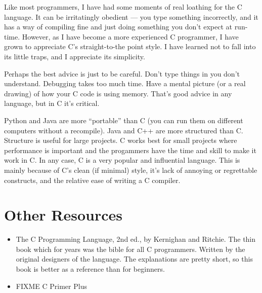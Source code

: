 Like most programmers, I have had some moments of real loathing for the C language. It can be irritatingly obedient --- you type something incorrectly, and it has a way of compiling fine and just doing something you don't expect at run-time. However, as I have become a more experienced C programmer, I have grown to appreciate C's straight-to-the point style. I have learned not to fall into its little traps, and I appreciate its simplicity.

Perhaps the best advice is just to be careful. Don't type things in you don't understand. Debugging takes too much time. Have a mental picture (or a real drawing) of how your C code is using memory. That's good advice in any language, but in C it's critical.

Python and Java are more ``portable'' than C (you can run them on different computers without a recompile). Java and C++ are more structured than C. Structure is useful for large projects. C works best for small projects where performance is important and the progammers have the time and skill to make it work in C. In any case, C is a very popular and influential language. This is mainly because of C's clean (if minimal) style, it's lack of annoying or regrettable constructs, and the relative ease of writing a C compiler.

\section{Other Resources}

\begin{itemize}
\item  The C Programming Language, 2nd ed., by Kernighan and Ritchie. The thin book which for years was the bible for all C programmers. Written by the original designers of the language. The explanations are pretty short, so this book is better as a reference than for beginners.

\item FIXME C Primer Plus
\end{itemize}

